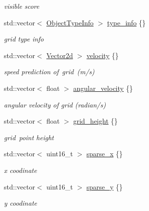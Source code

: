 \begin{DoxyCompactItemize}
\begin{DoxyCompactList}\small\item\em visible score \end{DoxyCompactList}\item 
std\+::vector$<$ \hyperlink{structmaf__perception__interface_1_1ObjectTypeInfo}{Object\+Type\+Info} $>$ \hyperlink{structmaf__perception__interface_1_1LidarBEVGridMapResult_a92eadedd3dfc0af6726894e189b36f1e}{type\+\_\+info} \{\}
\begin{DoxyCompactList}\small\item\em grid type info \end{DoxyCompactList}\item 
std\+::vector$<$ \hyperlink{structmaf__perception__interface_1_1Vector2d}{Vector2d} $>$ \hyperlink{structmaf__perception__interface_1_1LidarBEVGridMapResult_a78c415a3bf40f9a7b17168ca6a476001}{velocity} \{\}
\begin{DoxyCompactList}\small\item\em speed prediction of grid (m/s)  \end{DoxyCompactList}\item 
std\+::vector$<$ float $>$ \hyperlink{structmaf__perception__interface_1_1LidarBEVGridMapResult_a9c7e982dcb19b2e6b978e7407b7c3bbf}{angular\+\_\+velocity} \{\}
\begin{DoxyCompactList}\small\item\em angular velocity of grid (radian/s) \end{DoxyCompactList}\item 
std\+::vector$<$ float $>$ \hyperlink{structmaf__perception__interface_1_1LidarBEVGridMapResult_ab8a60289c1db1d57efdfc24329ee4b62}{grid\+\_\+height} \{\}
\begin{DoxyCompactList}\small\item\em grid point height \end{DoxyCompactList}\item 
std\+::vector$<$ uint16\+\_\+t $>$ \hyperlink{structmaf__perception__interface_1_1LidarBEVGridMapResult_ac8df709af55b054a691f6dd52841e021}{sparse\+\_\+x} \{\}
\begin{DoxyCompactList}\small\item\em x coodinate \end{DoxyCompactList}\item 
std\+::vector$<$ uint16\+\_\+t $>$ \hyperlink{structmaf__perception__interface_1_1LidarBEVGridMapResult_a5fa90f42bf9145c388a1771b4084e9a3}{sparse\+\_\+y} \{\}
\begin{DoxyCompactList}\small\item\em y coodinate \end{DoxyCompactList}\item 

\end{DoxyCompactItemize}
